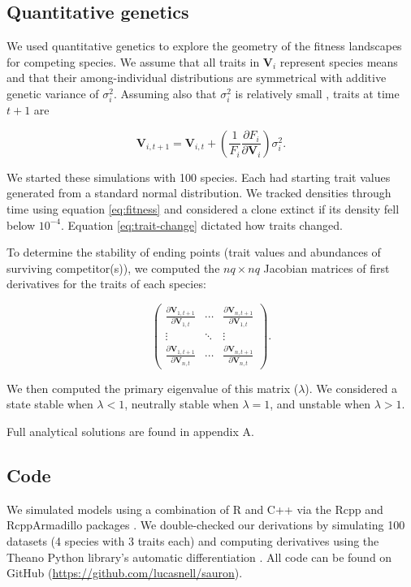 \subsection*{Quantitative genetics}

We used quantitative genetics to explore the geometry of the fitness landscapes for
competing species.
We assume that all traits in $\mathbf{V}_i$ represent species means and that their
among-individual distributions are symmetrical with additive genetic variance
of $\sigma^2_i$.
Assuming also that $\sigma^2_i$ is relatively small
\citep{Iwasa:1991eo,Abrams:2001va,Abrams:1993cr}, traits at time $t+1$ are

\begin{equation} \label{eq:trait-change}
    \mathbf{V}_{i,t+1} = \mathbf{V}_{i,t} + \left( \frac{1}{F_i}
        \frac{\partial F_i}{\partial \mathbf{V}_{i}} \right) \sigma^2_i
    \text{.}
\end{equation}

We started these simulations with 100 species.
Each had starting trait values generated from a standard normal distribution.
We tracked densities through time using equation \ref{eq:fitness} and
considered a clone extinct if its density fell below $10^{-4}$.
Equation \ref{eq:trait-change} dictated how traits changed.

To determine the stability of ending points (trait values and abundances of surviving
competitor(s)), we computed the $nq \times nq$ Jacobian matrices of first derivatives
for the traits of each species:

\begin{equation} \label{eq:jacobian}
    \begin{pmatrix}
        \frac{\partial \mathbf{V}_{1,t+1}}{\partial \mathbf{V}_{1,t}} & \cdots & \frac{\partial \mathbf{V}_{n,t+1}}{\partial \mathbf{V}_{1,t}} \\
        \vdots & \ddots & \vdots \\
        \frac{\partial \mathbf{V}_{1,t+1}}{\partial \mathbf{V}_{n,t}} & \cdots & \frac{\partial \mathbf{V}_{n,t+1}}{\partial \mathbf{V}_{n,t}}
    \end{pmatrix}
    \text{.}
\end{equation}

We then computed the primary eigenvalue of this matrix ($\lambda$).
We considered a state stable when $\lambda < 1$,
neutrally stable when $\lambda = 1$,
and unstable when $\lambda > 1$.

Full analytical solutions are found in appendix A.


\subsection*{Code}

We simulated models using a combination of R \cite{RCoreTeam:2014wf} and
C++ via the Rcpp and RcppArmadillo packages
\cite{Eddelbuettel:2014ad,Eddelbuettel:2013if,Sanderson:2016cs}.
We double-checked our derivations by simulating 100 datasets
(4 species with 3 traits each) and computing derivatives using the Theano Python
library's automatic differentiation \citep{TheanoDevelopmentTeam:2016uc}.
All code can be found on GitHub (\url{https://github.com/lucasnell/sauron}).

